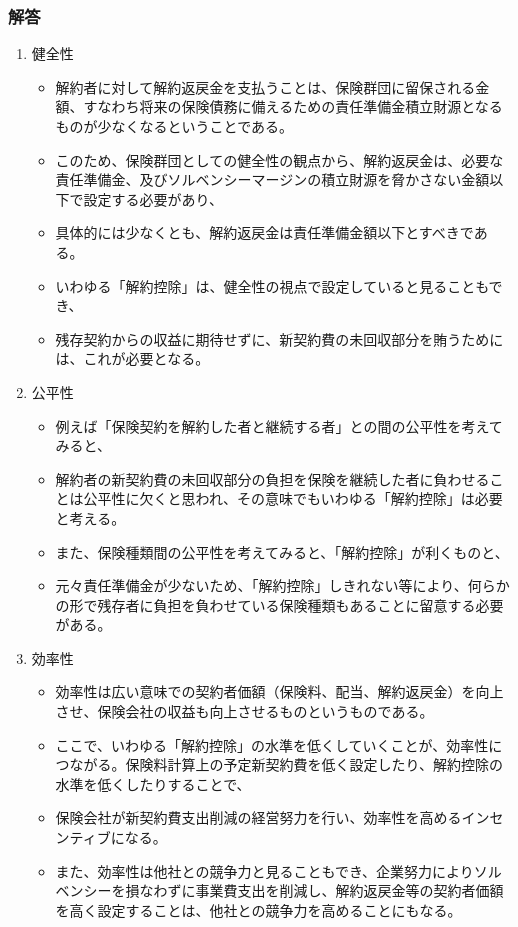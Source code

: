 \documentclass[report,gutter=10mm,fore-edge=10mm,uplatex,dvipdfmx]{jlreq}
\begin{document}
\subsubsection{解答}
\begin{enumerate}
\item 健全性
  \begin{itemize}
  \item 解約者に対して解約返戻金を支払うことは、保険群団に留保される金額、すなわち将来の保険債務に備えるための責任準備金積立財源となるものが少なくなるということである。
  \item このため、保険群団としての健全性の観点から、解約返戻金は、必要な責任準備金、及びソルベンシーマージンの積立財源を脅かさない金額以下で設定する必要があり、
  \item 具体的には少なくとも、解約返戻金は責任準備金額以下とすべきである。
  \item いわゆる「解約控除」は、健全性の視点で設定していると見ることもでき、
  \item 残存契約からの収益に期待せずに、新契約費の未回収部分を賄うためには、これが必要となる。
  \end{itemize}
\item 公平性
  \begin{itemize}
  \item 例えば「保険契約を解約した者と継続する者」との間の公平性を考えてみると、
  \item 解約者の新契約費の未回収部分の負担を保険を継続した者に負わせることは公平性に欠くと思われ、その意味でもいわゆる「解約控除」は必要と考える。
  \item また、保険種類間の公平性を考えてみると、「解約控除」が利くものと、
  \item 元々責任準備金が少ないため、「解約控除」しきれない等により、何らかの形で残存者に負担を負わせている保険種類もあることに留意する必要がある。
  \end{itemize}
\item 効率性
  \begin{itemize}
  \item 効率性は広い意味での契約者価額（保険料、配当、解約返戻金）を向上させ、保険会社の収益も向上させるものというものである。
  \item ここで、いわゆる「解約控除」の水準を低くしていくことが、効率性につながる。保険料計算上の予定新契約費を低く設定したり、解約控除の水準を低くしたりすることで、
  \item 保険会社が新契約費支出削減の経営努力を行い、効率性を高めるインセンティブになる。
  \item また、効率性は他社との競争力と見ることもでき、企業努力によりソルベンシーを損なわずに事業費支出を削減し、解約返戻金等の契約者価額を高く設定することは、他社との競争力を高めることにもなる。

\end{itemize}
\end{enumerate}
\end{document}
